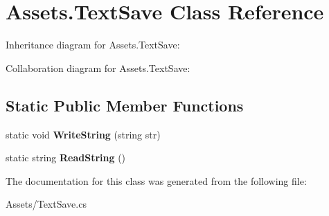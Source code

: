 \hypertarget{classAssets_1_1TextSave}{}\section{Assets.\+Text\+Save Class Reference}
\label{classAssets_1_1TextSave}


Inheritance diagram for Assets.\+Text\+Save\+:


Collaboration diagram for Assets.\+Text\+Save\+:
\subsection*{Static Public Member Functions}
\begin{DoxyCompactItemize}
\item 
static void {\bfseries Write\+String} (string str)\hypertarget{classAssets_1_1TextSave_ae73819cab704634d6b616f6c30064c17}{}\label{classAssets_1_1TextSave_ae73819cab704634d6b616f6c30064c17}

\item 
static string {\bfseries Read\+String} ()\hypertarget{classAssets_1_1TextSave_a1cd386396089adb9bb9e182ca55f35d9}{}\label{classAssets_1_1TextSave_a1cd386396089adb9bb9e182ca55f35d9}

\end{DoxyCompactItemize}


The documentation for this class was generated from the following file\+:\begin{DoxyCompactItemize}
\item 
Assets/Text\+Save.\+cs\end{DoxyCompactItemize}
